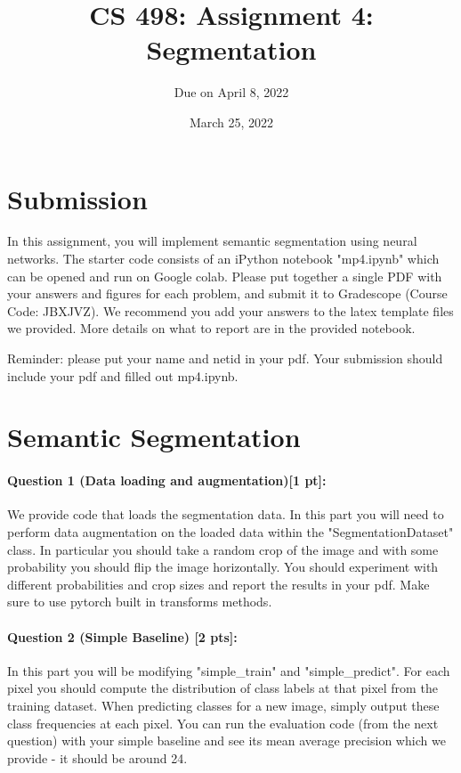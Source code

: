 \documentclass[11pt]{article}
\begin{document}
\author{Due on April 8, 2022}
\title{CS 498: Assignment 4: Segmentation}
\date{March 25, 2022}
\maketitle

\medskip


\section*{Submission}
In this assignment, you will implement semantic segmentation using neural networks. The starter code consists of an iPython notebook "mp4.ipynb" which can be opened and run on Google colab. Please put together a single PDF with your answers and figures for each problem, and submit it to Gradescope (Course Code: JBXJVZ). 
We recommend you add your answers to the latex template files we provided. More details on what to report are in the provided notebook. 

Reminder: please put your name and netid in your pdf.
Your submission should include your pdf and filled out mp4.ipynb.

\section*{Semantic Segmentation} 

\paragraph{Question 1 (Data loading and augmentation)[1 pt]:}
We provide code that loads the segmentation data. In this part you will need to perform data augmentation on the loaded data within the "SegmentationDataset" class. In particular you should take a random crop of the image and with some probability you should flip the image horizontally. You should experiment with different probabilities and crop sizes and report the results in your pdf. Make sure to use pytorch built in transforms methods.

\paragraph{Question 2 (Simple Baseline) [2 pts]:} 
In this part you will be modifying "simple\_train" and "simple\_predict". For each pixel you should compute the distribution of class labels at that pixel from the training dataset. When predicting classes for a new image, simply output these class frequencies at each pixel. You can run the evaluation code (from the next question) with your simple baseline and see its mean average precision which we provide - it should be around 24.
\end{document}
